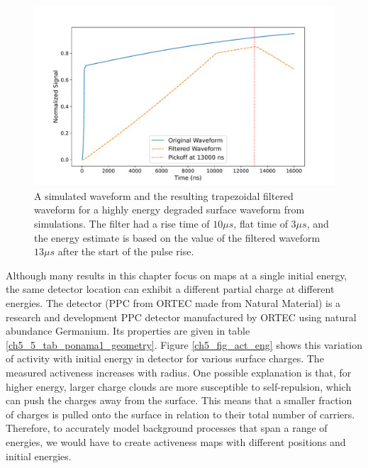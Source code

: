 \begin{figure}%
\centering
\includegraphics[trim={1cm 0cm 1cm 0cm},clip,width=0.99\linewidth]{ch5/figs/trap_example.pdf}
\caption{A simulated waveform and the resulting trapezoidal filtered waveform for a highly energy degraded surface waveform from {\ehd} simulations. The filter had a rise time of $10 \mu s$, flat time of $3 \mu s$, and the energy estimate is based on the value of the filtered waveform $13 \mu s$ after the start of the pulse rise.}
\label{ch5_fig_trap_filter}
\end{figure}

Although many results in this chapter focus on maps at a single initial energy, the same detector location can exhibit a different partial charge at different energies. The {\ponama} detector (PPC from ORTEC made from Natural Material) is a research and development PPC detector manufactured by ORTEC using natural abundance Germanium. Its properties are given in table \ref{ch5_5_tab_ponama1_geometry}. Figure \ref{ch5_fig_act_eng} shows this variation of activity with initial energy in {\ponama} detector for various surface charges. The measured activeness increases with radius. One possible explanation is that, for higher energy, larger charge clouds are more susceptible to self-repulsion, which can push the charges away from the surface. This means that a smaller fraction of charges is pulled onto the surface in relation to their total number of carriers. Therefore, to accurately model background processes that span a range of energies, we would have to create activeness maps with different positions and initial energies.



